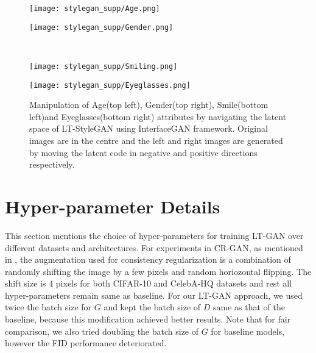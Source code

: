 \documentclass[10pt,twocolumn,letterpaper]{article}
\begin{document}
\begin{figure*}[t]
\centering
    \begin{minipage}{.48\textwidth}
    \texttt{[image: stylegan\_supp/Age.png]}
    \end{minipage}\hspace{0.05cm}
    \begin{minipage}{.48\textwidth}
    \texttt{[image: stylegan\_supp/Gender.png]}
    \end{minipage}\\
    \begin{minipage}{.48\textwidth}
    \texttt{[image: stylegan\_supp/Smiling.png]}
    \end{minipage}\hspace{0.05cm}
    \begin{minipage}{.48\textwidth}
    \texttt{[image: stylegan\_supp/Eyeglasses.png]}
    \end{minipage}
    \caption{\footnotesize{Manipulation of Age(top left), Gender(top right), Smile(bottom left)and Eyeglasses(bottom right) attributes by navigating the latent space of LT-StyleGAN using InterfaceGAN \cite{interface2020shen} framework. Original images are in the centre and the left and right images are generated by moving the latent code in negative and positive directions respectively.}}
    \label{fig:lt-stylegan2}
\end{figure*}

\section{Hyper-parameter Details}\label{sec:hyperparameter}
This section mentions the choice of hyper-parameters for training LT-GAN over different datasets and architectures.
For experiments in CR-GAN, as mentioned in \cite{crgan2019chen}, the augmentation used for consistency regularization is a combination of randomly shifting the image by a few pixels and random horiozontal flipping. The shift size is 4 pixels for both CIFAR-10 and CelebA-HQ datasets and rest all hyper-parameters remain same as baseline. For our LT-GAN approach, we used twice the batch size for $G$ and kept the batch size of $D$ same as that of the baseline, because this modification achieved better results.  Note that for fair comparison, we also tried doubling the batch size of $G$ for baseline models, however the FID performance deteriorated.
\end{document}
